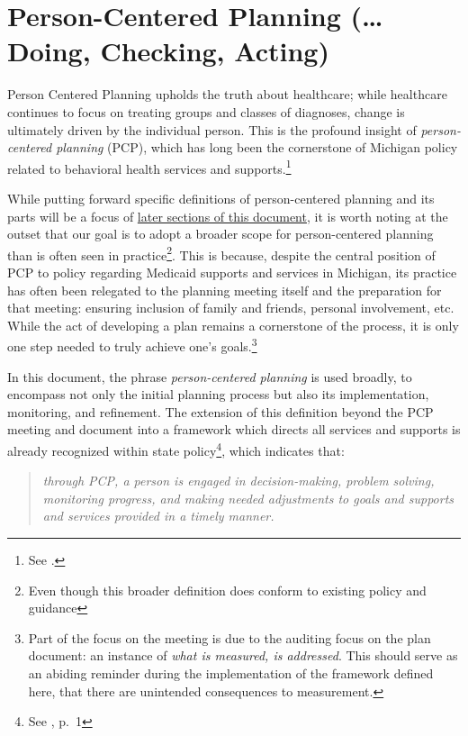 \documentclass[
]{book}
\begin{document}
\hypertarget{pcpdca}{%
\chapter{Person-Centered Planning (\ldots Doing, Checking, Acting)}\label{pcpdca}}

Person Centered Planning upholds the truth about healthcare; while healthcare continues to focus on treating groups and classes of diagnoses, change is ultimately driven by the individual person. This is the profound insight of \emph{person-centered planning} (PCP), which has long been the cornerstone of Michigan policy related to behavioral health services and supports.\footnote{See \citet{mi-mhc}.}

While putting forward specific definitions of person-centered planning and its parts will be a focus of \protect\hyperlink{bok}{later sections of this document}, it is worth noting at the outset that our goal is to adopt a broader scope for person-centered planning than is often seen in practice\footnote{Even though this broader definition does conform to existing policy and guidance}. This is because, despite the central position of PCP to policy regarding Medicaid supports and services in Michigan, its practice has often been relegated to the planning meeting itself and the preparation for that meeting: ensuring inclusion of family and friends, personal involvement, etc. While the act of developing a plan remains a cornerstone of the process, it is only one step needed to truly achieve one's goals.\footnote{Part of the focus on the meeting is due to the auditing focus on the plan document: an instance of \emph{what is measured, is addressed}. This should serve as an abiding reminder during the implementation of the framework defined here, that there are unintended consequences to measurement.}

In this document, the phrase \emph{person-centered planning} is used broadly, to encompass not only the initial planning process but also its implementation, monitoring, and refinement. The extension of this definition beyond the PCP meeting and document into a framework which directs all services and supports is already recognized within state policy\footnote{See \citet{pcp-policy}, p.~1}, which indicates that:

\begin{quote}
\emph{through PCP, a person is engaged in decision-making, problem solving, monitoring progress, and making needed adjustments to goals and supports and services provided in a timely manner.}
\end{quote}
\end{document}
